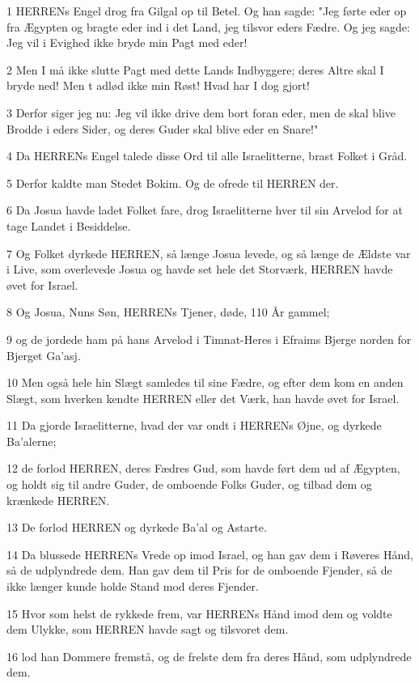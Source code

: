 \par 1 HERRENs Engel drog fra Gilgal op til Betel. Og han sagde: "Jeg førte eder op fra Ægypten og bragte eder ind i det Land, jeg tilsvor eders Fædre. Og jeg sagde: Jeg vil i Evighed ikke bryde min Pagt med eder!
\par 2 Men I må ikke slutte Pagt med dette Lands Indbyggere; deres Altre skal I bryde ned! Men t adlød ikke min Røst! Hvad har I dog gjort!
\par 3 Derfor siger jeg nu: Jeg vil ikke drive dem bort foran eder, men de skal blive Brodde i eders Sider, og deres Guder skal blive eder en Snare!"
\par 4 Da HERRENs Engel talede disse Ord til alle Israelitterne, brast Folket i Gråd.
\par 5 Derfor kaldte man Stedet Bokim. Og de ofrede til HERREN der.
\par 6 Da Josua havde ladet Folket fare, drog Israelitterne hver til sin Arvelod for at tage Landet i Besiddelse.
\par 7 Og Folket dyrkede HERREN, så længe Josua levede, og så længe de Ældste var i Live, som overlevede Josua og havde set hele det Storværk, HERREN havde øvet for Israel.
\par 8 Og Josua, Nuns Søn, HERRENs Tjener, døde, 110 År gammel;
\par 9 og de jordede ham på hans Arvelod i Timnat-Heres i Efraims Bjerge norden for Bjerget Ga'asj.
\par 10 Men også hele hin Slægt samledes til sine Fædre, og efter dem kom en anden Slægt, som hverken kendte HERREN eller det Værk, han havde øvet for Israel.
\par 11 Da gjorde Israelitterne, hvad der var ondt i HERRENs Øjne, og dyrkede Ba'alerne;
\par 12 de forlod HERREN, deres Fædres Gud, som havde ført dem ud af Ægypten, og holdt sig til andre Guder, de omboende Folks Guder, og tilbad dem og krænkede HERREN.
\par 13 De forlod HERREN og dyrkede Ba'al og Astarte.
\par 14 Da blussede HERRENs Vrede op imod Israel, og han gav dem i Røveres Hånd, så de udplyndrede dem. Han gav dem til Pris for de omboende Fjender, så de ikke længer kunde holde Stand mod deres Fjender.
\par 15 Hvor som helst de rykkede frem, var HERRENs Hånd imod dem og voldte dem Ulykke, som HERREN havde sagt og tilsvoret dem.
\par 16 lod han Dommere fremstå, og de frelste dem fra deres Hånd, som udplyndrede dem.

